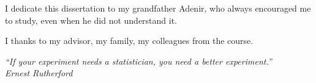 \begin{dedicatoria}
    \vspace*{\fill}
    \hfill
    \begin{minipage}{.6\textwidth}
        I dedicate this dissertation to my grandfather	Adenir, who always encouraged me to study, even
        when he did not understand it.
    \end{minipage}
\end{dedicatoria}
 
\begin{agradecimentos}
	I thanks to my advisor, my family, my colleagues from the course.  
\end{agradecimentos}

\begin{epigrafe}
\vspace*{\fill}

\begin{flushright}
    \hspace{7.5cm}
    \textit{
        ``If your experiment needs a statistician, you need a better
        experiment.''} \\
        \textit{Ernest Rutherford}
\end{flushright}
\end{epigrafe}